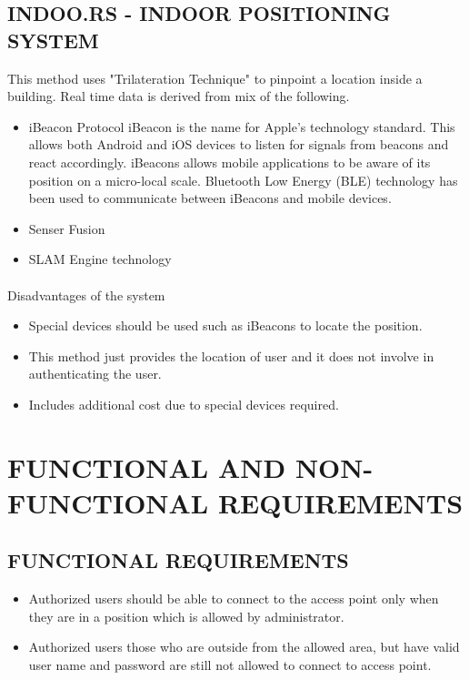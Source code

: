 \subsection{INDOO.RS - INDOOR POSITIONING SYSTEM}
This method uses "Trilateration Technique" to pinpoint a location inside a building. Real time data is derived from mix of the following.
	\begin{itemize}
		\item iBeacon Protocol \cite{iBeacons}
			\subitem iBeacon is the name for Apple's technology standard. This allows both Android and iOS devices to listen for signals from beacons and react accordingly. iBeacons allows mobile applications to be aware of its position on a micro-local scale. Bluetooth Low Energy (BLE) technology has been used to communicate between iBeacons and mobile devices.
		\item Senser Fusion
		\item SLAM Engine technology\cite{slam_eng}
	\end{itemize}

\paragraph{}
Disadvantages of the system
\begin{itemize}
	\item Special devices should be used such as iBeacons to locate the position.
	\item This method just provides the location of user and it does not involve in authenticating the user.
	\item Includes additional cost due to special devices required.
	
\end{itemize}


\section{FUNCTIONAL AND NON-FUNCTIONAL REQUIREMENTS}
\subsection{FUNCTIONAL REQUIREMENTS}
\begin{itemize}
	\item Authorized users should be able to connect to the access point only when they are in a position which is allowed by administrator.
	\item Authorized users those who are outside from the allowed area, but have valid user name and password are still not allowed to connect to access point.
\end{itemize}

